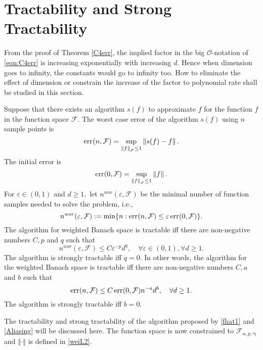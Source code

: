 \documentclass[article]{siamltex}
\def\bgam{{\boldsymbol \gamma }}
\newcommand{\norm}[1]{\left\Vert#1\right\Vert}
\DeclareMathOperator*{\err}{err} \DeclareMathOperator*{\avg}{avg}
\begin{document}
\vskip8mm  \section{Tractability and Strong Tractability}

From the proof of Theorem \ref{C4err}, the implied factor in the
big $\mathcal{O}$-notation of \eqref{eqn:C4err} is  increasing
exponentially with increasing $d.$ Hence when dimension goes to
infinity, the constants would go to infinity too. How to eliminate
the effect of dimension or constrain the increase of the factor to
polynomial rate shall be studied in this section.

Suppose that there exists an algorithm $s(f)$ to approximate $f$
for the function $f$ in the function space $\mathcal F.$  The
worst case error of the algorithm $s(f)$ using $n$ sample points
is
$$\err\hspace{0.01cm}(n,\mathcal F)=
\sup\limits_{{\norm{f}}_{\mathcal F} \leq 1 }\norm{s(f)-f}.$$ The
initial error is
\begin{equation}\label{initialerror}\err\hspace{0.01cm}(0,\mathcal F)=
\sup\limits_{{\norm{f}}_{\mathcal F} \leq 1
}\norm{f}.\end{equation} For $\varepsilon\in(0,1)$ and $d\ge 1,$
let $n^{wor}(\varepsilon,\mathcal F)$ be the minimal number of
function samples needed to solve the problem, i.e.,
$$n^{wor}(\varepsilon,\mathcal F):= \min\{n: \err\hspace{0.01cm}(n,\mathcal F)\le \varepsilon\err\hspace{0.01cm}(0,\mathcal F) \}.$$
The algorithm for weighted Banach space is  tractable  iff there
are non-negative numbers $C, p$ and $q$ such that
$$n^{wor}(\varepsilon,\mathcal F)\le C
\varepsilon^{-p}d^{q},\quad \forall \varepsilon\in(0,1), \forall
d\ge 1.$$ The  algorithm is  strongly tractable iff $q=0.$ In
other words,  the algorithm for the weighted Banach space is
tractable iff there are non-negative numbers $C, a$ and $b$ such
that
$$\err\hspace{0.01cm}(n,\mathcal F)\le C\err\hspace{0.01cm}(0,\mathcal F)
n^{-a}d^{b},\quad  \forall d\ge 1.$$ The  algorithm is strongly
tractable iff $b=0.$

The tractability and strong tractability of the algorithm proposed
by \eqref{fhat1} and \eqref{Aliasing} will be discussed here. The
function space is now constrained to $\mathcal F_{\alpha,p,\bgam}$
and $\norm{\cdot}$ is defined in \eqref{weiL2}.
\end{document}
